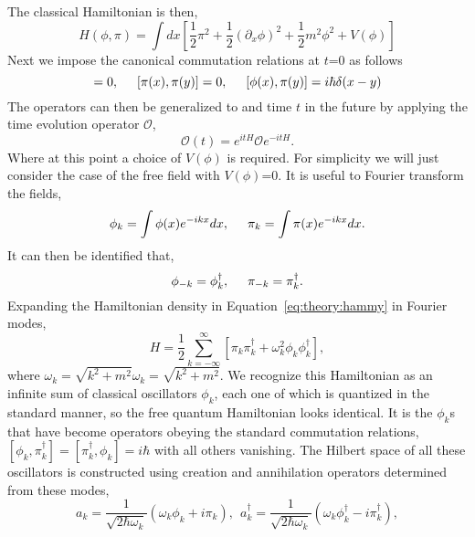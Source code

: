The classical Hamiltonian is then,
\begin{equation}
    H(\phi,\pi) = \int dx\left[ \frac{1}{2}\pi^2 + \frac{1}{2}(\partial_{x}\phi)^2 + \frac{1}{2}m^{2}\phi^{2} + V(\phi) \right]
    \label{eq:theory:hammy}
\end{equation}
Next we impose the canonical commutation relations at $t$=0 as follows
\begin{equation*}
 [\phi(x),\phi(y)] = 0,  \hspace{0.5cm} [\pi(x), \pi(y)] = 0, \hspace{0.5cm} [\phi(x),\pi(y)] = i\hbar \delta(x-y)
\end{equation*}
The operators can then be generalized to and time $t$ in the future by applying the time evolution operator $\mathcal{O}$,
\begin{equation*}
     \mathcal{O}(t) = e^{itH} \mathcal{O} e^{-itH} .
\end{equation*}
Where at this point a choice of $V(\phi)$ is required.
For simplicity we will just consider the case of the free field with $V(\phi)$=0.
It is useful to Fourier transform the fields,
\begin{equation*}
      \phi_k = \int \phi(x) e^{-ikx} dx, \hspace{0.5cm} \pi_k = \int \pi(x) e^{-ikx} dx .
\end{equation*}
It can then be identified that,
\begin{equation*}
    \phi_{-k} = \phi_k^\dagger, \hspace{0.5cm} \pi_{-k} = \pi_k^\dagger.
\end{equation*}
Expanding the Hamiltonian density in Equation~\ref{eq:theory:hammy} in Fourier modes,
\begin{equation}
     H=\frac{1}{2}\sum_{k=-\infty}^{\infty}\left[\pi_k \pi_k^\dagger + \omega_k^2\phi_k\phi_k^\dagger\right],
     \label{eq:theory:quantumhammy}
\end{equation}
where $ {\displaystyle \omega _{k}={\sqrt {k^{2}+m^{2}}}}\omega_k = \sqrt{k^2+m^2}$.
We recognize this Hamiltonian as an infinite sum of classical oscillators $\phi_{k}$, each one of which is quantized in the standard manner, so the free quantum Hamiltonian looks identical. It is the $\phi_{k}$s that have become operators obeying the standard commutation relations, $[\phi_{k},\pi_{k}^{\dagger}] = [\pi_{k}^{\dagger},\phi_{k}] = i\hbar$  with all others vanishing.
The Hilbert space of all these oscillators is constructed using creation and annihilation operators determined from these modes,
\begin{equation*}
     a_k = \frac{1}{\sqrt{2\hbar\omega_k}}\left(\omega_k\phi_k + i\pi_k\right), \ \ a_k^\dagger = \frac{1}{\sqrt{2\hbar\omega_k}}\left(\omega_k\phi_k^\dagger - i\pi_k^\dagger\right), 
\end{equation*}
